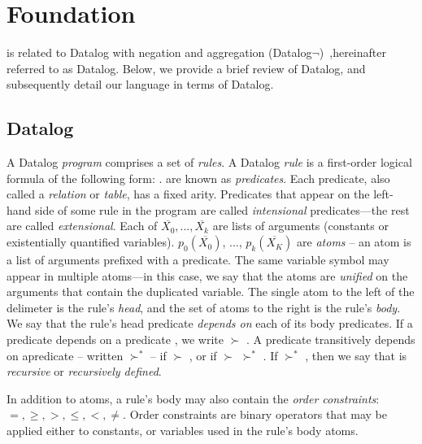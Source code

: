 \section{Foundation}
\label{sec:lang}

\lang is related to Datalog with negation and aggregation
(Datalog$\lnot$)~\cite{ullmanbook},hereinafter referred to as Datalog.
Below, we provide a brief review of Datalog, and subsequently detail our
language in terms of Datalog.

\subsection{Datalog}
\label{sec:datalog}

A Datalog {\em program} comprises a set of {\em rules}.  A Datalog {\em rule}
is a first-order logical formula of the following form:
.   are known as {\em
predicates}.  Each predicate, also called a {\em relation} or {\em table}, has
a fixed arity.  Predicates that appear on the left-hand side of some rule in
the program are called {\em intensional} predicates---the rest are called {\em
extensional}.  Each of $\overline{X_0}, ..., \overline{X_k}$ are lists of
arguments (constants or existentially quantified variables).
$p_0(\overline{X_0})$, ..., $p_k(\overline{X_K})$ are {\em atoms} -- an atom is
a list of arguments prefixed with a predicate.  The same variable symbol may
appear in multiple atoms---in this case, we say that the atoms are {\em
unified} on the arguments that contain the duplicated variable.  The single
atom to the left of the \dedalus{:-} delimeter is the rule's {\em head}, and
the set of atoms to the right is the rule's {\em body}.  We say that the rule's
head predicate {\em depends on} each of its body predicates.  If a predicate
 depends on a predicate , we write  $\succ$
.  A predicate  transitively depends on apredicate
 -- written  $\succ^*$  -- if 
$\succ$ , or if  $\succ$  $\succ^*$
.  If  $\succ^*$ , then we say that 
is {\em recursive} or {\em recursively defined}.

In addition to atoms, a rule's body may also contain the {\em order
constraints}: $=, \geq, >, \leq, <, \neq$.  Order constraints are binary
operators that may be applied either to constants, or variables used in the
rule's body atoms.

